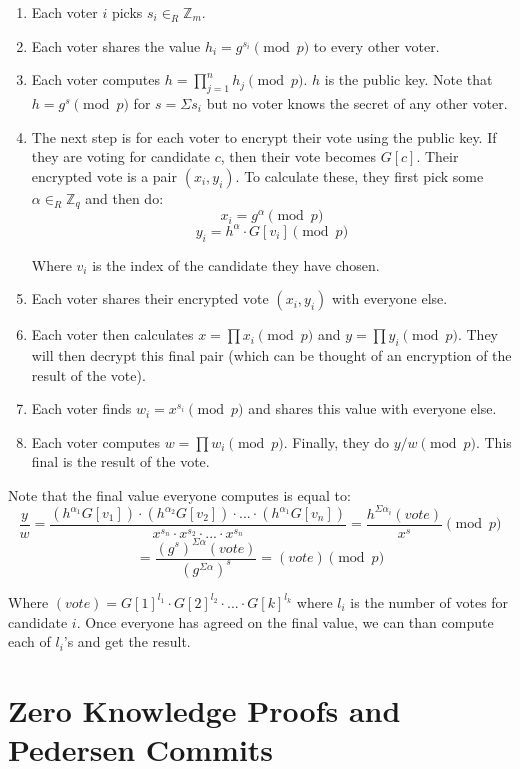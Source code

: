 \documentclass[11pt]{article}
\begin{document}
\begin{enumerate}
	\item Each voter $i$ picks $s_i \in_{R} \mathbb{Z}_m$.
	\item Each voter shares the value $h_i = g^{s_i} \pmod p$ to every other voter.
	\item Each voter computes $h = \prod_{j=1}^{n} h_j \pmod p$. $h$ is the public key. Note that $h = g^{s} \pmod p$ for $s = \Sigma s_i$ but no voter knows the secret of any other voter.
	\item The next step is for each voter to encrypt their vote using the public key. If they are voting for candidate $c$, then their vote becomes $G[c]$. Their encrypted vote is a pair $(x_i, y_i)$. To calculate these, they first pick some $\alpha \in_{R} \mathbb{Z}_q$ and then do:
	$$x_i = g^{\alpha} \pmod p$$
	$$y_i = h^{\alpha} \cdot G[v_i] \pmod p$$
	
	Where $v_i$ is the index of the candidate they have chosen.
	\item Each voter shares their encrypted vote $(x_i, y_i)$ with everyone else.
	\item Each voter then calculates $x = \prod x_i \pmod p$ and $y = \prod y_i \pmod p$. They will then decrypt this final pair (which can be thought of an encryption of the result of the vote).
	\item Each voter finds $w_i = x^{s_i} \pmod p$ and shares this value with everyone else.
	\item Each voter computes $w = \prod w_i \pmod p$. Finally, they do $y/w \pmod p$. This final is the result of the vote.
\end{enumerate}

Note that the final value everyone computes is equal to:
$$\frac{y}{w} = \frac{(h^{\alpha_1} G[v_1]) \cdot (h^{\alpha_2} G[v_2]) \cdot ... \cdot (h^{\alpha_1} G[v_n])}{x^{s_n} \cdot x^{s_2} \cdot ... \cdot x^{s_n}} = \frac{h^{\Sigma \alpha_i}(vote)}{x^{s}} \pmod p$$
$$= \frac{(g^{s})^{\Sigma\alpha}(vote)}{(g^{\Sigma\alpha})^s} = (vote) \pmod p$$

Where $(vote) = G[1]^{l_1} \cdot G[2]^{l_2} \cdot ... \cdot G[k]^{l_k}$ where $l_i$ is the number of votes for candidate $i$. Once everyone has agreed on the final value, we can than compute each of $l_i$'s and get the result.

\section{Zero Knowledge Proofs and Pedersen Commits}
\end{document}
